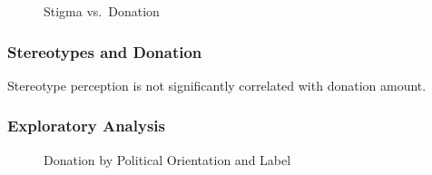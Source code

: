\documentclass[
  man,
  floatsintext,
  longtable,
  nolmodern,
  notxfonts,
  notimes,
  colorlinks=true,linkcolor=blue,citecolor=blue,urlcolor=blue]{apa7}
\begin{document}
\begin{figure}

\caption{\label{fig-correlation-stigma-donation}Stigma vs.~Donation}


\end{figure}%

\subsubsection{Stereotypes and Donation}\label{stereotypes-and-donation}

Stereotype perception is not significantly correlated with donation
amount.

\subsubsection{Exploratory Analysis}\label{exploratory-analysis}

\begin{figure}

\caption{\label{fig-donate-political-by-label}Donation by Political
Orientation and Label}


\end{figure}%
\end{document}

